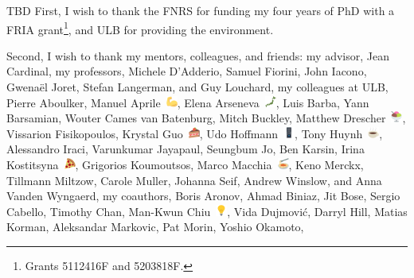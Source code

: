 
\ifdraft%
TBD
\else%
First, I wish to thank the FNRS for funding my four years of PhD with a FRIA
grant\footnote{%
Grants 5112416F and 5203818F.%
}, and ULB for providing the environment.

Second, I wish to thank my mentors, colleagues, and friends:
%
my advisor,
Jean Cardinal,
%
my professors,
Michele D'Adderio,
Samuel Fiorini,
John Iacono,
Gwenaël Joret,
Stefan Langerman,
and
Guy Louchard,
%
my colleagues at ULB,
Pierre Aboulker,
Manuel Aprile~\includegraphics[height=1em]{figures/1f4aa},
Elena Arseneva~\includegraphics[height=1em]{figures/1f5fe},
Luis Barba,
Yann Barsamian,
Wouter Cames van Batenburg,
Mitch Buckley,
Matthew Drescher~\includegraphics[height=1em]{figures/1f368},
Vissarion Fisikopoulos,
Krystal Guo~\includegraphics[height=1em]{figures/1f370},
Udo Hoffmann~\includegraphics[height=1em]{figures/1f5a5},
Tony Huynh~\includegraphics[height=1em]{figures/2615},
Alessandro Iraci,
Varunkumar Jayapaul,
Seungbum Jo,
Ben Karsin,
Irina Kostitsyna~\includegraphics[height=1em]{figures/1f355},
Grigorios Koumoutsos,
Marco Macchia~\includegraphics[height=1em]{figures/1f35d},
Keno Merckx,
Tillmann Miltzow,
Carole Muller,
Johanna Seif,
Andrew Winslow,
and
Anna Vanden Wyngaerd,
%
my coauthors,
Boris Aronov,
Ahmad Biniaz,
Jit Bose,
Sergio Cabello,
Timothy Chan,
Man-Kwun Chiu~\includegraphics[height=1em]{figures/1f4a1},
Vida Dujmovi\'c,
Darryl Hill,
Matias Korman,
Aleksandar Markovic,
Pat Morin,
Yoshio Okamoto,
